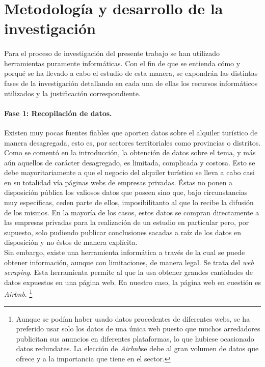 \documentclass[a4paper]{article}
\newcommand*{\airbnb}{\textit{Airbnb}}
\begin{document}

    \section{Metodología y desarrollo de la investigación}

        \paragraph*{}
        Para el proceso de investigación del presente trabajo se han utilizado herramientas puramente informáticas. Con el fin de que se entienda cómo y 
        porqué se ha llevado a cabo el estudio de esta manera, se expondrán las distintas fases de la investigación detallando en cada una de ellas los recursos 
        informáticos utilizados y la justificación correspondiente.

        \paragraph*{\textbf{Fase 1: Recopilación de datos.}}
        Existen muy pocas fuentes fiables que aporten datos sobre el alquiler turístico de manera desagregada, esto es, 
        por sectores territoriales como provincias o distritos.
        Como se comentó en la introducción, la obtención de datos sobre el tema, y más aún aquellos de carácter desagregado, es limitada, complicada
        y costosa. Esto se debe mayoritariamente a que el negocio del alquiler turístico se lleva a cabo casi en su totalidad vía páginas webs de empresas
        privadas. Éstas no ponen a disposición pública los valiosos datos que poseen sino que, bajo circunstancias muy específicas, ceden parte de ellos, imposibilitanto al que lo recibe la difusión de los mismos. En la mayoría de los casos, estos datos se compran directamente a las empresas privadas para 
        la realización de un estudio en particular pero, por supuesto, solo pudiendo publicar conclusiones sacadas a raíz de los datos en disposición y no éstos 
        de manera explícita. \\

        \noindent
        Sin embargo, existe una herramienta informática a través de la cual se puede obtener información, aunque con limitaciones, de manera legal.
        Se trata del \textit{web scraping}. Esta herramienta permite al que la usa obtener grandes cantidades de datos expuestos en una página web.
        En nuestro caso, la página web en cuestión es \textit{Airbnb}. \footnote{Aunque se podían haber usado datos procedentes de diferentes webs, 
        se ha preferido usar solo los datos de una única web puesto que muchos arredadores publicitan sus anuncios en diferentes plataformas, lo que hubiese 
        ocasionado datos redundates. La elección de \airbnb se debe al gran volumen de datos que ofrece y a la importancia que tiene en el sector.}
\end{document}
